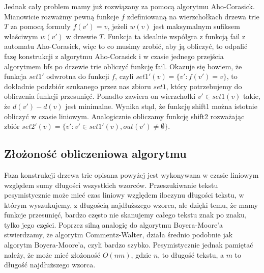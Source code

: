 Jednak cały problem mamy już rozwiązany za pomocą algorytmu Aho-Corasick. Mianowicie rozważmy pewną funkcje $f$ zdefiniowaną na wierzchołkach drzewa trie $T$ za pomocą formuły $f(v') = v$, jeżeli $w(v)$ jest maksymalnym sufiksem właściwym $w(v')$ w drzewie $T$. Funkcja ta idealnie współgra z funkcją fail z automatu Aho-Corasick, więc to co musimy zrobić, aby ją obliczyć, to odpalić fazę konstrukcji z algorytmu Aho-Corasick i w czasie jednego przejścia algorytmem bfs po drzewie trie obliczyć funkcję fail. Okazuje się bowiem, że funkcja $set1'$ odwrotna do funkcji $f$, czyli $set1'(v) = \{v' : f(v')=v \}$, to dokładnie podzbiór szukanego przez nas zbioru $set1$, który potrzebujemy do obliczenia funkcji przesunięć. Ponadto zawiera on wierzchołki $v' \in set1(v)$ takie, że $d(v')-d(v)$ jest minimalne. Wynika stąd, że funkcję shift1 można istotnie obliczyć w czasie liniowym. Analogicznie obliczamy funkcję shift2 rozważając zbiór $set2'(v) = \{ v' : v' \in set1'(v), out(v') \not = \emptyset\}$. 

\subsection{Złożoność obliczeniowa algorytmu}
Faza konstrukcji drzewa trie opisana powyżej jest wykonywana w czasie liniowym względem sumy długości wszystkich wzorców. Przeszukiwanie tekstu pesymistycznie może mieć czas liniowy względem iloczynu długości tekstu, w którym wyszukujemy, z długością najdłuższego wzorca, ale dzięki temu, że mamy funkcje przesunięć, bardzo często nie skanujemy całego tekstu znak po znaku, tylko jego części. Poprzez silną analogię do algorytmu Boyera-Moore'a stwierdzamy, że algorytm Commentz-Walter, działa średnio podobnie jak algorytm Boyera-Moore'a, czyli bardzo szybko. Pesymistycznie jednak pamiętać należy, że może mieć złożoność $O(nm)$, gdzie $n$, to długość tekstu, a $m$ to długość najdłuższego wzorca.